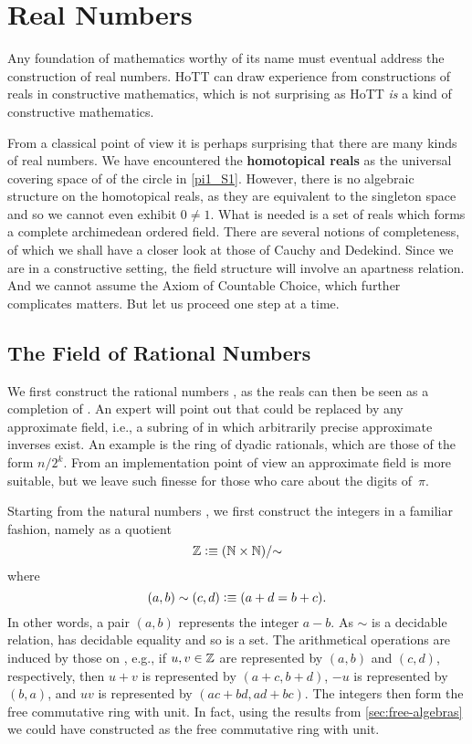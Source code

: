 \newcommand{\rclim}{\mathsf{lim}} %
\newcommand{\Qp}{\Q_{+}}

\chapter{Real Numbers}
\label{cha:real-numbers}

Any foundation of mathematics worthy of its name must eventual address the construction of
real numbers. HoTT can draw experience from constructions of reals in constructive
mathematics, which is not surprising as HoTT \emph{is} a kind of constructive mathematics.

From a classical point of view it is perhaps surprising that there are many kinds of real
numbers. We have encountered the \textbf{homotopical reals} as the universal covering
space of of the circle in \autoref{pi1_S1}. However, there is no algebraic structure on
the homotopical reals, as they are equivalent to the singleton space and so we cannot even
exhibit $0 \neq 1$. What is needed is a set of reals which forms a complete archimedean
ordered field. There are several notions of completeness, of which we shall have a closer
look at those of Cauchy and Dedekind. Since we are in a constructive setting, the field
structure will involve an apartness relation. And we cannot assume the Axiom of Countable
Choice, which further complicates matters. But let us proceed one step at a time.

\section{The Field of Rational Numbers}
\label{sec:field-rati-numb}

We first construct the rational numbers \Q, as the reals can then be seen as a completion
of \Q. An expert will point out that \Q could be replaced by any approximate field, i.e.,
a subring of \Q in which arbitrarily precise approximate inverses exist. An example is the
ring of dyadic rationals, which are those of the form $n/2^k$. From an
implementation point of view an approximate field is more suitable, but we leave such
finesse for those who care about the digits of~$\pi$.

Starting from the natural numbers \N, we first construct the integers in a familiar
fashion, namely as a quotient
%
\[ \mathbb{Z} \vcentcolon\equiv (\mathbb{N} \times \mathbb{N})/{\sim} \]
%
where
%
\[ (a,b) \sim (c,d) \vcentcolon\equiv (a + d = b + c). \]
%
In other words, a pair $(a,b)$ represents the integer $a - b$. As $\sim$ is a decidable
relation, \Z has decidable equality and so is a set. The arithmetical operations are
induced by those on \N, e.g., if $u, v \in \mathbb{Z}$ are represented by $(a,b)$ and $(c,d)$,
respectively, then $u + v$ is represented by $(a + c, b + d)$, $-u$ is represented by $(b,
a)$, and $u v$ is represented by $(a c + b d, a d + b c)$. The integers \Z then form the
free commutative ring with unit. In fact, using the results from
\autoref{sec:free-algebras} we could have constructed \Z as the free commutative ring with
unit.

